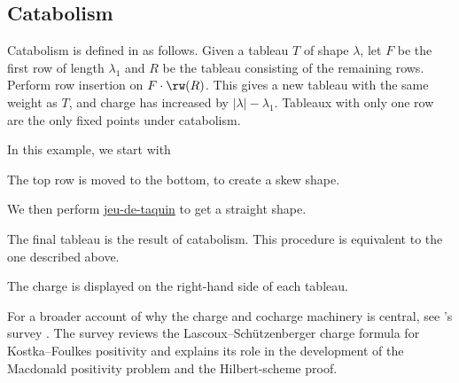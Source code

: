  
\subsection[catabolism]{Catabolism}
 
Catabolism is defined in \cite[Exercise~5.6.1]{Lothaire2002} as follows.
Given a tableau $T$ of shape $\lambda$, let $F$ be the first row of length $\lambda_1$
and $R$ be the tableau consisting of the remaining rows.
Perform row insertion on $F \cdot \rw(R)$.
This gives a new tableau with the same weight as $T$,
and charge has increased by $|\lambda|-\lambda_1$.
Tableaux with only one row are the only fixed points under catabolism.
 
\begin{example*}
In this example, we start with
\begin{figure}
\end{figure}
The top row is moved to the bottom, to create a skew shape.
\begin{figure}
\end{figure}
We then perform \hyperref[jeuDeTaquin]{jeu-de-taquin} to get a straight shape.

\begin{figure}
\end{figure}

The final tableau is the result of catabolism.
This procedure is equivalent to the one described above.
\end{example*}

\begin{example*}
The charge is displayed on the right-hand side of each tableau.
\begin{figure}
\end{figure}
\end{example*}

For a broader account of why the charge and cocharge machinery is central,
see 's survey \cite{Haiman2002CDM}.  The survey reviews the
Lascoux--Sch{\"u}tzenberger charge formula for Kostka--Foulkes positivity and
explains its role in the development of the Macdonald positivity problem and
the Hilbert-scheme proof.
 
